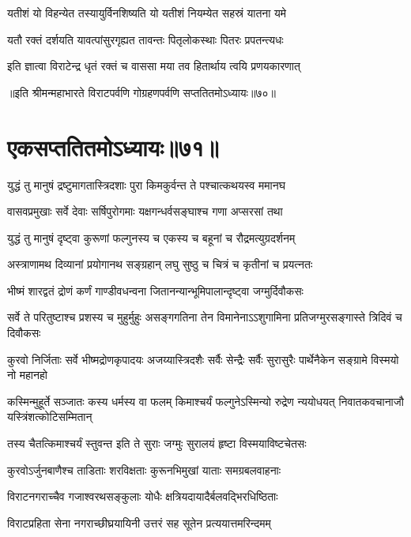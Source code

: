 \twolineshloka
{यतीशं यो विहन्येत तस्यायुर्विनशिष्यति}
{यो यतीशं नियम्येत सहस्रं यातना यमे}


\twolineshloka
{यतौ रक्तं दर्शयति यावत्पांसुरगृह्यत}
{तावन्तः पितृलोकस्थाः पितरः प्रपतन्त्यधः}


\twolineshloka
{इति ज्ञात्वा विराटेन्द्र धृतं रक्तं च वाससा}
{मया तव हितार्थाय त्वयि प्रणयकारणात्}

॥इति श्रीमन्महाभारते विराटपर्वणि गोग्रहणपर्वणि सप्ततितमोऽध्यायः॥७०॥

\chapter{एकसप्ततितमोऽध्यायः॥७१॥}

\twolineshloka
{युद्धं तु मानुषं द्रष्टुमागतास्त्रिदशाः पुरा}
{किमकुर्वन्त ते पश्चात्कथयस्व ममानघ}



\twolineshloka
{वासवप्रमुखाः सर्वे देवाः सर्षिपुरोगमाः}
{यक्षगन्धर्वसङ्घाश्च गणा अप्सरसां तथा}


\twolineshloka
{युद्धं तु मानुषं दृष्ट्वा कुरूणां फल्गुनस्य च}
{एकस्य च बहूनां च रौद्रमत्युग्रदर्शनम्}


\twolineshloka
{अस्त्राणामथ दिव्यानां प्रयोगानथ सङ्ग्रहान्}
{लघु सुष्ठु च चित्रं च कृतीनां च प्रयत्नतः}


\twolineshloka
{भीष्मं शारद्वतं द्रोणं कर्णं गाण्डीवधन्वना}
{जितानन्यान्भूमिपालान्दृष्ट्वा जग्मुर्दिवौकसः}


\threelineshloka
{सर्वे ते परितुष्टाश्च प्रशस्य च मुहुर्मुहुः}
{असङ्गगतिना तेन विमानेनाऽऽशुगामिना}
{प्रतिजग्मुरसङ्गास्ते त्रिदिवं च दिवौकसः}


\threelineshloka
{कुरवो निर्जिताः सर्वे भीष्मद्रोणकृपादयः}
{अजय्यास्त्रिदशैः सर्वैः सेन्द्रैः सर्वैः सुरासुरैः}
{पार्थेनैकेन सङ्ग्रामे विस्मयो नो महानहो}


\onelineshloka
{कस्मिन्मुहूर्ते सञ्जातः कस्य धर्मस्य वा फलम्}
\twolineshloka
{किमाश्चर्यं फल्गुनेऽस्मिन्यो रुद्रेण न्ययोधयत्}
{निवातकवचानाजौ यस्त्रिंशत्कोटिसम्मितान्}


\twolineshloka
{तस्य चैतत्किमाश्चर्यं स्तुवन्त इति ते सुराः}
{जग्मुः सुरालयं हृष्टा विस्मयाविष्टचेतसः}


\twolineshloka
{कुरवोऽर्जुनबाणैश्च ताडिताः शरविक्षताः}
{कुरूनभिमुखां याताः समग्रबलवाहनाः}


\twolineshloka
{विराटनगराच्चैव गजाश्वरथसङ्कुलाः}
{योधैः क्षत्रियदायादैर्बलवद्भिरधिष्ठिताः}


\twolineshloka
{विराटप्रहिता सेना नगराच्छीघ्रयायिनी}
{उत्तरं सह सूतेन प्रत्ययात्तमरिन्दमम्}



